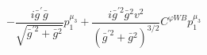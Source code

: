 %
\begin{dmath*}
%
  -  \frac{i {\bar g}^\prime {\bar g}{}}{\sqrt{{\bar g}^{\prime 2} + {\bar g}{}^2}}p_1^{\mu_3}  +  \frac{i {\bar g}^{\prime 2} {\bar g}{}^2 v^2}{\left({\bar g}^{\prime 2} + {\bar g}{}^2\right)^{3/2}}C^{ \varphi  WB} p_1^{\mu_3}
%
\end{dmath*}
%
